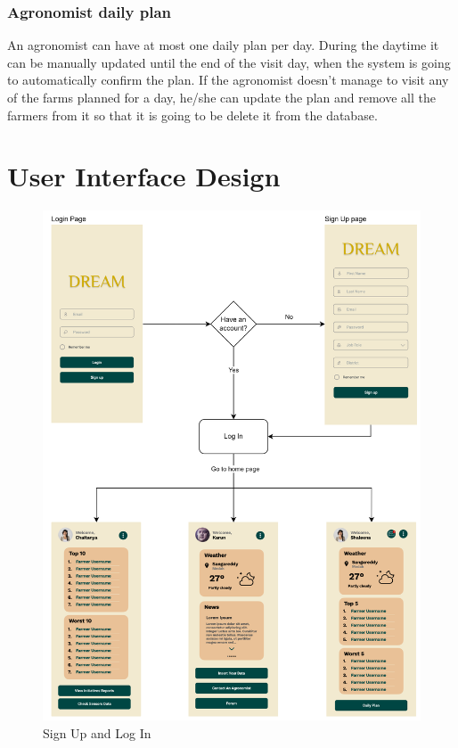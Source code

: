 \documentclass[table, 12pt]{article}
\begin{document}
\subsubsection{Agronomist daily plan} An agronomist can have at most one daily plan per day.
During the daytime it can be manually updated until the end of the visit day, when the system is going to automatically confirm the plan. If the agronomist doesn't manage to visit any of the farms planned for a day, he/she can update the plan and remove all the farmers from it so that it is going to be delete it from the database.

\newpage
\section{User Interface Design}
\begin{center}
    \begin{figure}[H]
        \includegraphics[scale=0.74, center]{assets/MockUp/SignUpandLogin.png}
        \caption{Sign Up and Log In}
        \label{fig: signMockup}
    \end{figure}
\end{center}
\end{document}
